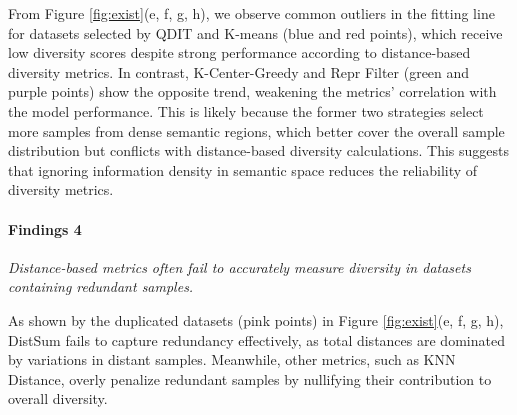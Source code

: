 From Figure \ref{fig:exist}(e, f, g, h), we observe common outliers in the fitting line for datasets selected by QDIT and K-means (blue and red points), which receive low diversity scores despite strong performance according to distance-based diversity metrics. In contrast, K-Center-Greedy and Repr Filter (green and purple points) show the opposite trend, weakening the metrics' correlation with the model performance. This is likely because the former two strategies select more samples from dense semantic regions, which better cover the overall sample distribution but conflicts with distance-based diversity calculations. This suggests that ignoring information density in semantic space reduces the reliability of diversity metrics.


\paragraph{Findings 4}
\textit{Distance-based metrics often fail to accurately measure diversity in datasets containing redundant samples.}

As shown by the duplicated datasets (pink points) in Figure \ref{fig:exist}(e, f, g, h), DistSum fails to capture redundancy effectively, as total distances are dominated by variations in distant samples. Meanwhile, other metrics, such as KNN Distance, overly penalize redundant samples by nullifying their contribution to overall diversity.

